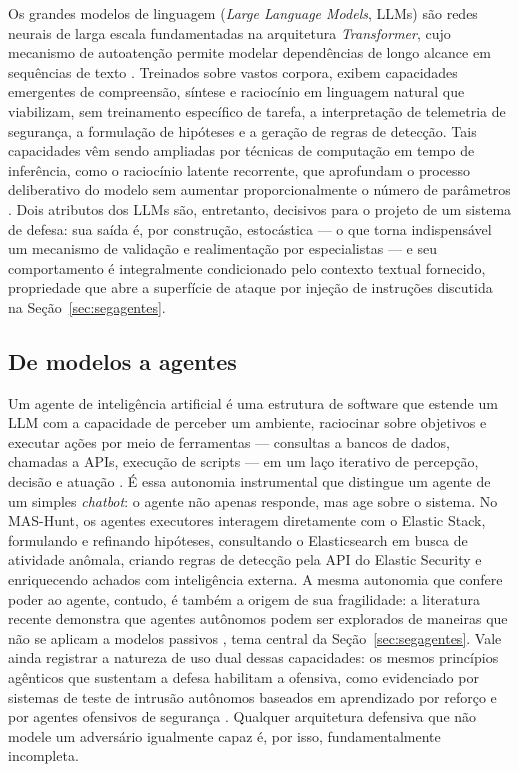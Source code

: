 Os grandes modelos de linguagem (\textit{Large Language Models}, LLMs) são redes neurais de larga escala fundamentadas na arquitetura \textit{Transformer}, cujo mecanismo de autoatenção permite modelar dependências de longo alcance em sequências de texto \cite{vaswani2017attention}. Treinados sobre vastos corpora, exibem capacidades emergentes de compreensão, síntese e raciocínio em linguagem natural que viabilizam, sem treinamento específico de tarefa, a interpretação de telemetria de segurança, a formulação de hipóteses e a geração de regras de detecção. Tais capacidades vêm sendo ampliadas por técnicas de computação em tempo de inferência, como o raciocínio latente recorrente, que aprofundam o processo deliberativo do modelo sem aumentar proporcionalmente o número de parâmetros \cite{arxiv250205171}. Dois atributos dos LLMs são, entretanto, decisivos para o projeto de um sistema de defesa: sua saída é, por construção, estocástica — o que torna indispensável um mecanismo de validação e realimentação por especialistas \cite{academia22} — e seu comportamento é integralmente condicionado pelo contexto textual fornecido, propriedade que abre a superfície de ataque por injeção de instruções discutida na Seção~\ref{sec:segagentes}.

\subsection{De modelos a agentes}
\label{subsec:agentes}

Um agente de inteligência artificial é uma estrutura de software que estende um LLM com a capacidade de perceber um ambiente, raciocinar sobre objetivos e executar ações por meio de ferramentas — consultas a bancos de dados, chamadas a APIs, execução de scripts — em um laço iterativo de percepção, decisão e atuação \cite{academia20, guo2024survey}. É essa autonomia instrumental que distingue um agente de um simples \textit{chatbot}: o agente não apenas responde, mas age sobre o sistema. No MAS-Hunt, os agentes executores interagem diretamente com o Elastic Stack, formulando e refinando hipóteses, consultando o Elasticsearch em busca de atividade anômala, criando regras de detecção pela API do Elastic Security e enriquecendo achados com inteligência externa. A mesma autonomia que confere poder ao agente, contudo, é também a origem de sua fragilidade: a literatura recente demonstra que agentes autônomos podem ser explorados de maneiras que não se aplicam a modelos passivos \cite{academia20, NEURIPS2024_eb113910}, tema central da Seção~\ref{sec:segagentes}. Vale ainda registrar a natureza de uso dual dessas capacidades: os mesmos princípios agênticos que sustentam a defesa habilitam a ofensiva, como evidenciado por sistemas de teste de intrusão autônomos baseados em aprendizado por reforço \cite{moreno2025analysis} e por agentes ofensivos de segurança \cite{academia20}. Qualquer arquitetura defensiva que não modele um adversário igualmente capaz é, por isso, fundamentalmente incompleta.

